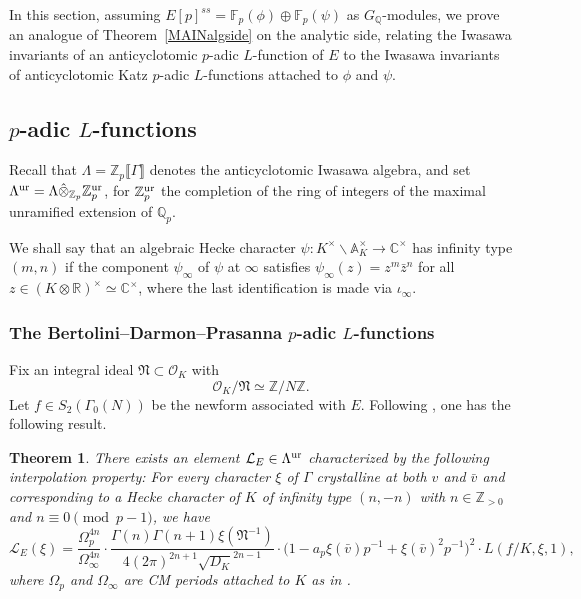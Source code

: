\documentclass[10pt]{amsart}
\numberwithin{equation}{section}
\newtheorem{theorem}{Theorem}
\theoremstyle{definition}
\theoremstyle{remark}
\newcommand{\Z}{\mathbb{Z}}
\newcommand{\Lcal}{\mathcal{L}}
\newcommand{\Q}{\mathbb{Q}}
\begin{document}
In this section, assuming $E[p]^{ss}=\mathbb{F}_p(\phi)\oplus\mathbb{F}_p(\psi)$ as $G_\Q$-modules, we prove an analogue of  Theorem~\ref{MAINalgside} on the analytic side, relating the Iwasawa invariants of an anticyclotomic $p$-adic $L$-function of $E$ to the Iwasawa invariants of anticyclotomic Katz $p$-adic $L$-functions attached to $\phi$ and $\psi$. 


\subsection{\texorpdfstring{$p$}{p}-adic \texorpdfstring{$L$}{L}-functions}\label{subsec:Lp}

Recall that $\Lambda=\Z_p\llbracket\Gamma\rrbracket$ denotes the anticyclotomic Iwasawa algebra, and set $\Lambda^{\rm ur}=\Lambda\hat{\otimes}_{\Z_p}\Z_p^{\rm ur}$,  
for $\Z_p^{\rm ur}$ the completion of the ring of integers of the maximal unramified extension of $\Q_p$. 

We shall say that an algebraic Hecke character $\psi:K^\times\backslash\mathbb{A}_K^\times\rightarrow\mathbb{C}^\times$ has infinity type $(m,n)$ if 
the component $\psi_\infty$ of $\psi$ at $\infty$ satisfies
$\psi_\infty(z)=z^{m}\bar{z}^{n}$ for all $z\in (K\otimes\mathbb{R})^\times\simeq\mathbb{C}^\times$, 
where the last identification is made via $\iota_\infty$.


\subsubsection{The Bertolini--Darmon--Prasanna \texorpdfstring{$p$}{p}-adic \texorpdfstring{$L$}{l}-functions} 

Fix an integral ideal $\mathfrak{N}\subset\mathcal{O}_K$ with 
\begin{equation}\label{eq:N}
\mathcal{O}_K/\mathfrak{N}\simeq\Z/N\Z.
\end{equation}
Let $f\in S_2(\Gamma_0(N))$ be the newform associated with $E$. Following \cite{BDP}, one has the following result. 

\begin{theorem}\label{thm:BDP}
There exists an element $\Lcal_E\in\Lambda^{\rm ur}$ characterized by the following interpolation property: For every character $\xi$ of $\Gamma$ crystalline at both $v$ and $\bar{v}$ and corresponding to a Hecke character of $K$ of infinity type $(n,-n)$ with $n\in\Z_{>0}$ and $n\equiv 0\pmod{p-1}$, we have
\[
\mathcal{L}_E(\xi)=\frac{\Omega_p^{4n}}{\Omega_\infty^{4n}}\cdot\frac{\Gamma(n)\Gamma(n+1)\xi(\mathfrak{N}^{-1})}{4(2\pi)^{2n+1}\sqrt{D_K}^{2n-1}}\cdot\bigl(1-a_p\xi(\bar{v})p^{-1}+\xi(\bar{v})^2p^{-1}\bigr)^2\cdot L(f/K,\xi,1),
\]  
where $\Omega_p$ and $\Omega_\infty$ are CM periods attached to $K$ as in \cite[\S{2.5}]{cas-hsieh1}.
\end{theorem}
\end{document}
